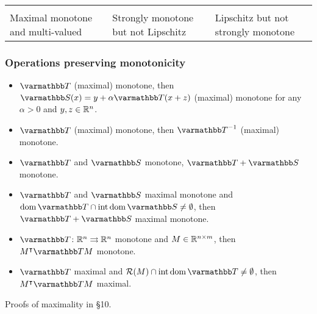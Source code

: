 \documentclass[10pt,mathserif]{beamer}
\begin{document}
\begin{frame}[plain]
\begin{center}
\begin{tabular}{P{2.5cm}P{2.5cm}P{2.5cm}}
{\begin{tikzpicture}[scale=1]
\end{tikzpicture}}
&
\\
Maximal monotone and multi-valued&Strongly monotone but not Lipschitz&Lipschitz but not strongly monotone
\end{tabular}
\end{center}
\end{frame}




\begin{frame}
\frametitle{Operations preserving monotonicity}
\begin{itemize}
\item
 $\opT $ (maximal) monotone, then $\opS (x)=y+\alpha \opT(x+z)$ (maximal) monotone for any $\alpha>0$ and $y,z\in \mathbb{R}^n$.
\item
$\opT $ (maximal) monotone, then $\opT ^{-1}$ (maximal) monotone.
\item
$\opT $ and $\opS$ monotone, $\opT +\opS $ monotone.
\item
$\opT $ and $\opS $ maximal monotone and $\dom \opT \cap\intr\dom \opS \ne \emptyset$, then $\opT +\opS $ maximal monotone.
\item
$\opT \colon\reals^n\rightrightarrows \reals^n$ monotone and $M \in \mathbb{R}^{n \times m}$, then $M^\intercal\opT M$ monotone.
\item
$\opT $ maximal and $ \mathcal{R}(M)\cap \intr\dom \opT \ne \emptyset$, then $M^\intercal\opT M$ maximal.
\end{itemize}

\vspace{0.2in}

Proofs of maximality in \S10.
\end{frame}
\end{document}
